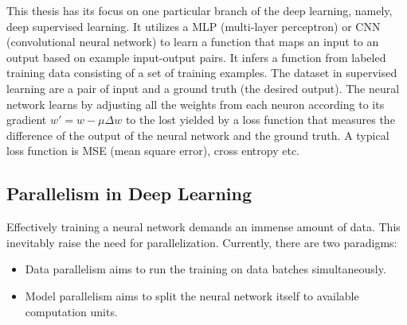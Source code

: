This thesis has its focus on one particular branch of the deep learning, namely, 
deep supervised learning. It utilizes a MLP (multi-layer perceptron) or CNN 
(convolutional neural network) to learn a function that maps an input to an 
output based on example input-output pairs. It infers a function from labeled 
training data consisting of a set of training examples. The dataset in 
supervised learning are a pair of input and a ground truth (the desired output).
The neural network learns by adjusting all the weights from each neuron 
according to its gradient $w' = w - \mu \Delta w$ to the lost yielded by a loss 
function that measures the difference of the output of the neural network and 
the ground truth. A typical loss function is MSE (mean square error), cross 
entropy etc.

\subsection{Parallelism in Deep Learning}
Effectively training a neural network demands an immense amount of data. This 
inevitably raise the need for parallelization. Currently, there are two 
paradigms:
\begin{itemize}
    \item Data parallelism aims to run the training on data batches 
        simultaneously.
    \item Model parallelism aims to split the neural network itself to available 
        computation units.
\end{itemize}

